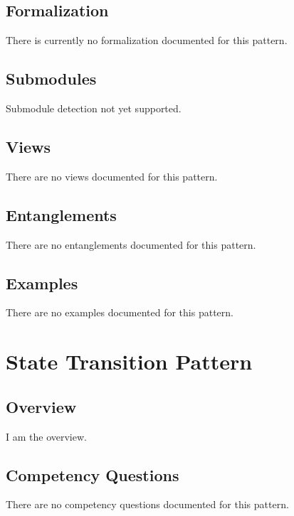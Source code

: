 \subsection{Formalization}
\label{ssec:formalization}
There is currently no formalization documented for this pattern.

\subsection{Submodules}
\label{ssec:submodules}
Submodule detection not yet supported.

\subsection{Views}
\label{ssec:views}
There are no views documented for this pattern.


\subsection{Entanglements}
\label{ssec:entanglements}
There are no entanglements documented for this pattern.

\subsection{Examples}
\label{ssec:examples}
There are no examples documented for this pattern.


\section{State Transition Pattern}
\label{sec:state-transition-pattern}
\subsection{Overview}
\label{ssec:overview}
I am the overview.

\subsection{Competency Questions}
\label{ssec:cqs}
There are no competency questions documented for this pattern.

